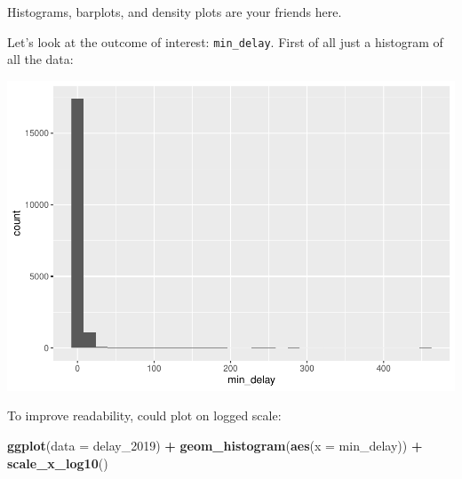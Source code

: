 \documentclass[
]{book}
\newenvironment{Shaded}{\begin{snugshade}}{\end{snugshade}}
\newcommand{\CommentTok}[1]{\textcolor[rgb]{0.56,0.35,0.01}{\textit{#1}}}
\newcommand{\DataTypeTok}[1]{\textcolor[rgb]{0.13,0.29,0.53}{#1}}
\newcommand{\DecValTok}[1]{\textcolor[rgb]{0.00,0.00,0.81}{#1}}
\newcommand{\KeywordTok}[1]{\textcolor[rgb]{0.13,0.29,0.53}{\textbf{#1}}}
\newcommand{\NormalTok}[1]{#1}
\newcommand{\OperatorTok}[1]{\textcolor[rgb]{0.81,0.36,0.00}{\textbf{#1}}}
\newcommand{\StringTok}[1]{\textcolor[rgb]{0.31,0.60,0.02}{#1}}
\begin{document}
Histograms, barplots, and density plots are your friends here.

Let's look at the outcome of interest: \texttt{min\_delay}. First of all just a histogram of all the data:

\begin{Shaded}
\end{Shaded}

\includegraphics{telling_stories_with_data_files/figure-latex/unnamed-chunk-256-1.pdf}

To improve readability, could plot on logged scale:

\begin{Shaded}
\begin{Highlighting}[]
\KeywordTok{ggplot}\NormalTok{(}\DataTypeTok{data =}\NormalTok{ delay_}\DecValTok{2019}\NormalTok{) }\OperatorTok{+}\StringTok{ }
\StringTok{  }\KeywordTok{geom_histogram}\NormalTok{(}\KeywordTok{aes}\NormalTok{(}\DataTypeTok{x =}\NormalTok{ min_delay)) }\OperatorTok{+}\StringTok{ }\KeywordTok{scale_x_log10}\NormalTok{()}
\end{Highlighting}
\end{Shaded}
\end{document}
